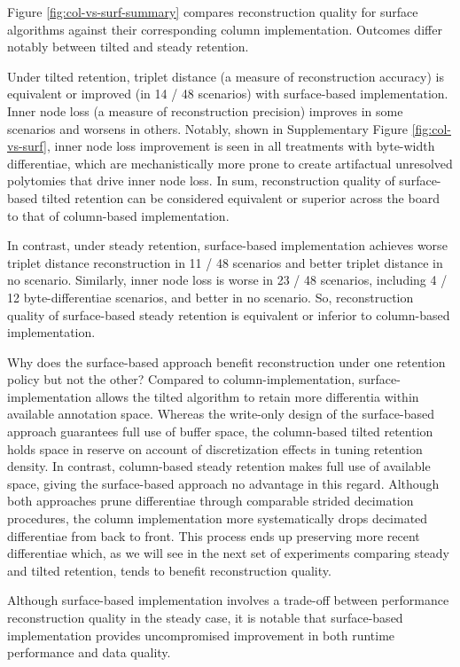 Figure \ref{fig:col-vs-surf-summary} compares reconstruction quality for surface algorithms against their corresponding column implementation.
Outcomes differ notably between tilted and steady retention.

Under tilted retention, triplet distance (a measure of reconstruction accuracy) is equivalent or improved (in 14 / 48 scenarios) with surface-based implementation.
Inner node loss (a measure of reconstruction precision) improves in some scenarios and worsens in others.
Notably, shown in Supplementary Figure \ref{fig:col-vs-surf}, inner node loss improvement is seen in all treatments with byte-width differentiae, which are mechanistically more prone to create artifactual unresolved polytomies that drive inner node loss.
In sum, reconstruction quality of surface-based tilted retention can be considered equivalent or superior across the board to that of column-based implementation.

In contrast, under steady retention, surface-based implementation achieves worse triplet distance reconstruction in 11 / 48 scenarios and better triplet distance in no scenario.
Similarly, inner node loss is worse in 23 / 48 scenarios, including 4 / 12 byte-differentiae scenarios, and better in no scenario.
So, reconstruction quality of surface-based steady retention is equivalent or inferior to column-based implementation.

Why does the surface-based approach benefit reconstruction under one retention policy but not the other?
Compared to column-implementation, surface-implementation allows the tilted algorithm to retain more differentia within available annotation space.
Whereas the write-only design of the surface-based approach guarantees full use of buffer space, the column-based tilted retention holds space in reserve on account of discretization effects in tuning retention density.
In contrast, column-based steady retention makes full use of available space, giving the surface-based approach no advantage in this regard.
Although both approaches prune differentiae through comparable strided decimation procedures, the column implementation more systematically drops decimated differentiae from back to front.
This process ends up preserving more recent differentiae which, as we will see in the next set of experiments comparing steady and tilted retention, tends to benefit reconstruction quality.

Although surface-based implementation involves a trade-off between performance reconstruction quality in the steady case, it is notable that surface-based implementation provides uncompromised improvement in both runtime performance and data quality.

